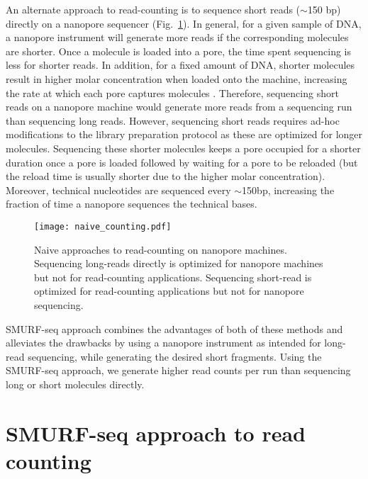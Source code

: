 An alternate approach to read-counting is to sequence short reads
($\sim$150 bp) directly on a nanopore sequencer
(Fig.~\ref{naive_counting}).
In general, for a given sample of DNA, a nanopore instrument will
generate more reads if the corresponding molecules are shorter.  Once a
molecule is loaded into a pore, the time spent sequencing is less for
shorter reads. In addition, for a fixed amount of DNA, shorter molecules
result in higher molar concentration when loaded onto the machine,
increasing the rate at which each pore captures molecules
\citep{muthukumar2010theory,wanunu2008dna}. Therefore, sequencing short
reads on a nanopore machine would generate more reads from a sequencing
run than sequencing long reads.
However, sequencing short reads requires ad-hoc modifications to the
library preparation protocol as these are optimized for longer
molecules.  Sequencing these shorter molecules keeps a pore occupied for
a shorter duration once a pore is loaded followed by waiting for a pore
to be reloaded (but the reload time is usually shorter due to the higher
molar concentration). Moreover, technical nucleotides are sequenced
every $\sim$150bp, increasing the fraction of time a nanopore sequences
the technical bases.

\begin{figure}[b!]
\centering
\texttt{[image: naive\_counting.pdf]}
\caption[Naive approaches to read-counting on nanopore machines]{
  Naive approaches to read-counting on nanopore machines.
  Sequencing long-reads directly is optimized for nanopore machines but
  not for read-counting applications.
  Sequencing short-read is optimized for read-counting applications but
  not for nanopore sequencing.}
\label{naive_counting}
\end{figure}

SMURF-seq approach combines the advantages of both of these methods
and alleviates the drawbacks by using a nanopore instrument as
intended for long-read sequencing, while generating the desired short
fragments. Using the SMURF-seq approach, we generate higher read counts
per run than sequencing long or short molecules directly.


\section{SMURF-seq approach to read counting}

